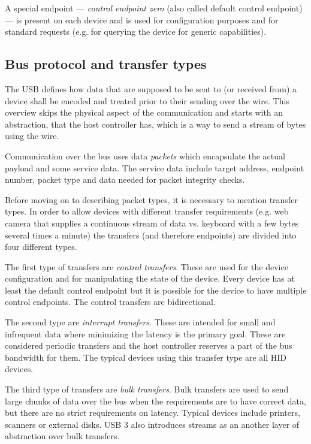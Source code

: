 A special endpoint — \textit{control endpoint zero} (also called default
control endpoint) — is present on each device and is used for configuration
purposes and for standard requests (e.g. for querying the device for
generic capabilities).

\subsection{Bus protocol and transfer types}

The USB defines how data that are supposed to be sent to (or received from) a
device shall be encoded and treated prior to their sending over the wire. This
overview skips the physical aspect of the communication and starts with an
abstraction, that the host controller has, which is a way to send a stream of
bytes using the wire.

Communication over the bus uses data \textit{packets} which encapsulate the
actual payload and some service data. The service data include target address,
endpoint number, packet type and data needed for packet integrity checks.

Before moving on to describing packet types, it is necessary to mention
transfer types. In order to allow devices with different transfer requirements
(e.g. web camera that supplies a continuous stream of data vs. keyboard with
a few bytes several times a minute) the transfers (and therefore endpoints) are
divided into four different types.

The first type of transfers are \textit{control transfers}. These are used for
the device configuration and for manipulating the state of the device. Every
device has at least the default control endpoint but it is possible for the
device to have multiple control endpoints. The control transfers are
bidirectional.

The second type are \textit{interrupt transfers}. These are intended for small
and infrequent data where minimizing the latency is the primary goal. These are
considered periodic transfers and the host controller reserves a part of the
bus bandwidth for them. The typical devices using this transfer type are all
HID devices.

The third type of transfers are \textit{bulk transfers}. Bulk transfers are
used to send large chunks of data over the bus when the requirements are to
have correct data, but there are no strict requirements on latency. Typical
devices include printers, scanners or external disks. USB 3 also introduces
streams as an another layer of abstraction over bulk transfers.

